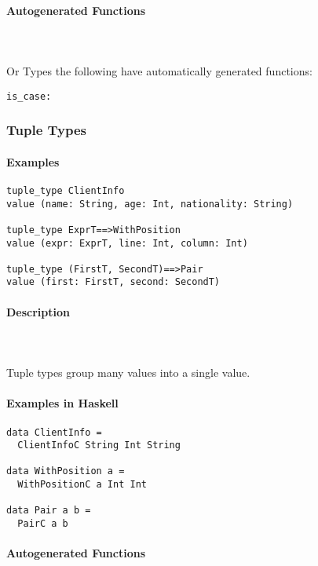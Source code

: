 \documentclass{article}
\def\H{Haskell}
\begin{document}
\paragraph{Autogenerated Functions}\mbox{} \\\\
Or Types the following have automatically generated functions:

\begin{verbatim}
is_case:
\end{verbatim}

\subsubsection{Tuple Types}

\paragraph{Examples}

\begin{verbatim}
tuple_type ClientInfo
value (name: String, age: Int, nationality: String)

tuple_type ExprT==>WithPosition
value (expr: ExprT, line: Int, column: Int)

tuple_type (FirstT, SecondT)==>Pair
value (first: FirstT, second: SecondT)
\end{verbatim}

\paragraph{Description}\mbox{} \\\\
Tuple types group many values into a single value.

\paragraph{Examples in \H}

\begin{verbatim}
data ClientInfo =
  ClientInfoC String Int String

data WithPosition a = 
  WithPositionC a Int Int

data Pair a b = 
  PairC a b
\end{verbatim}

\paragraph{Autogenerated Functions}\mbox{} \\\\
\end{document}

